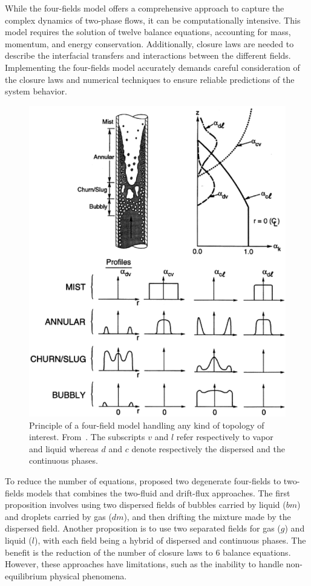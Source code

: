 While the four-fields model offers a comprehensive approach to capture the complex dynamics of two-phase flows, it can be computationally intensive. This model requires the solution of twelve balance equations, accounting for mass, momentum, and energy conservation. Additionally, closure laws are needed to describe the interfacial transfers and interactions between the different fields. Implementing the four-fields model accurately demands careful consideration of the closure laws and numerical techniques to ensure reliable predictions of the system behavior.
\begin{figure}[!ht]
    \centering
    \includegraphics[scale=0.4]{Figure/Lahey.png}
    \caption{Principle of a four-field model handling any kind of topology of interest. From~\cite{Lahey2001}. The subscripts $v$ and $l$ refer respectively to vapor and liquid whereas $d$ and $c$ denote respectively the dispersed and the continuous phases.}
    \label{fig:lahey}
\end{figure}
To reduce the number of equations, \cite{Morel2007} proposed two degenerate four-fields to two-fields models that combines the two-fluid and drift-flux approaches. The first proposition involves using two dispersed fields of bubbles carried by liquid ($bm$) and droplets carried by gas ($dm$), and then drifting the mixture made by the dispersed field. Another proposition is to use two separated fields for gas ($g$) and liquid ($l$), with each field being a hybrid of dispersed and continuous phases.
The benefit is the reduction of the number of closure laws to 6 balance equations. However, these approaches have limitations, such as the inability to handle non-equilibrium physical phenomena.

